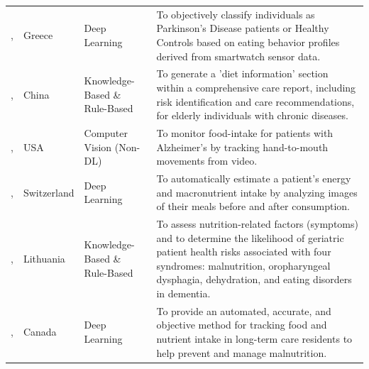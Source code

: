 \begin{longtable}{p{}p{}p{}p{}}
    \addlinespace
    \citeauthor{kyritsisAssessmentRealLife2021}, \citeyear{kyritsisAssessmentRealLife2021}                                             & Greece            & Deep Learning                     & To objectively classify individuals as Parkinson's Disease patients or Healthy Controls based on eating behavior profiles derived from smartwatch sensor data.                                                                         \\
    \addlinespace
    \citeauthor{liKGSCSSmartCare2024}, \citeyear{liKGSCSSmartCare2024}                                                                 & China             & Knowledge-Based \& Rule-Based     & To generate a 'diet information' section within a comprehensive care report, including risk identification and care recommendations, for elderly individuals with chronic diseases.                                                    \\
    \addlinespace
    \citeauthor{obaidAutomaticFoodintakeMonitoring2018}, \citeyear{obaidAutomaticFoodintakeMonitoring2018}                             & USA               & Computer Vision (Non-DL)          & To monitor food-intake for patients with Alzheimer's by tracking hand-to-mouth movements from video.                                                                                                                                   \\
    \addlinespace
    \citeauthor{papathanailEvaluationNovelArtificial2021}, \citeyear{papathanailEvaluationNovelArtificial2021}                         & Switzerland       & Deep Learning                     & To automatically estimate a patient's energy and macronutrient intake by analyzing images of their meals before and after consumption.                                                                                                 \\
    \addlinespace
    \citeauthor{petrauskasExplainableArtificialIntelligencebased2021}, \citeyear{petrauskasExplainableArtificialIntelligencebased2021} & Lithuania         & Knowledge-Based \& Rule-Based     & To assess nutrition-related factors (symptoms) and to determine the likelihood of geriatric patient health risks associated with four syndromes: malnutrition, oropharyngeal dysphagia, dehydration, and eating disorders in dementia. \\
    \addlinespace
    \citeauthor{pfistererEnhancingFoodIntake2022}, \citeyear{pfistererEnhancingFoodIntake2022}                                         & Canada            & Deep Learning                     & To provide an automated, accurate, and objective method for tracking food and nutrient intake in long-term care residents to help prevent and manage malnutrition.                                                                     \\

\end{longtable}
